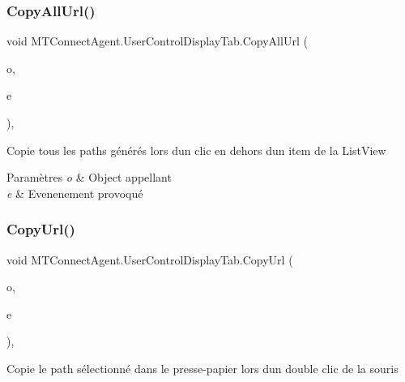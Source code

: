 \subsubsection{\texorpdfstring{Copy\+All\+Url()}{CopyAllUrl()}}
{\footnotesize\ttfamily void M\+T\+Connect\+Agent.\+User\+Control\+Display\+Tab.\+Copy\+All\+Url (\begin{DoxyParamCaption}\item[{object}]{o,  }\item[{Mouse\+Event\+Args}]{e }\end{DoxyParamCaption})\hspace{0.3cm}{\ttfamily [inline]}, {\ttfamily [private]}}



Copie tous les paths générés lors d\textquotesingle{}un clic en dehors d\textquotesingle{}un item de la List\+View 


\begin{DoxyParams}{Paramètres}
{\em o} & Object appellant\\
\hline
{\em e} & Evenenement provoqué\\
\hline
\end{DoxyParams}
\mbox{\label{class_m_t_connect_agent_1_1_user_control_display_tab_a105e38f9a87a83a4bc4c1af82bf45993}} 
\subsubsection{\texorpdfstring{Copy\+Url()}{CopyUrl()}}
{\footnotesize\ttfamily void M\+T\+Connect\+Agent.\+User\+Control\+Display\+Tab.\+Copy\+Url (\begin{DoxyParamCaption}\item[{object}]{o,  }\item[{Mouse\+Event\+Args}]{e }\end{DoxyParamCaption})\hspace{0.3cm}{\ttfamily [inline]}, {\ttfamily [private]}}



Copie le path sélectionné dans le presse-\/papier lors d\textquotesingle{}un double clic de la souris 


